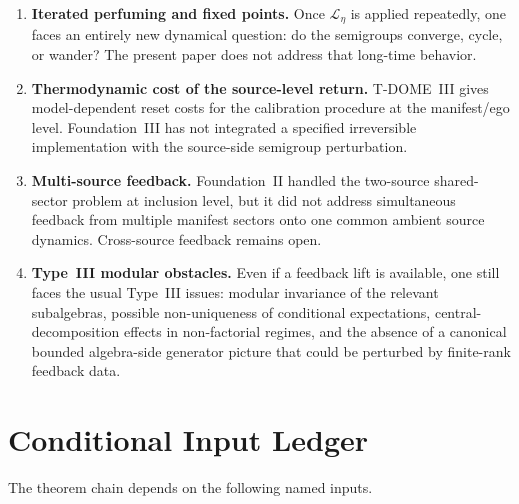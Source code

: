 \documentclass[12pt]{article}
\theoremstyle{definition}
\theoremstyle{remark}
\begin{document}
\begin{enumerate}
  theorem, or a rate-distortion model with a genuine bottleneck, is
  required before any actual minimax deficit can be transported.
\item \textbf{Iterated perfuming and fixed points.} Once
  \(\mathscr L_\eta\) is applied repeatedly, one faces an entirely new
  dynamical question: do the semigroups converge, cycle, or wander? The
  present paper does not address that long-time behavior.
\item \textbf{Thermodynamic cost of the source-level return.} T-DOME~III
  gives model-dependent reset costs for the calibration procedure at the
  manifest/ego level. Foundation~III has not integrated a specified
  irreversible implementation with the source-side semigroup
  perturbation.
\item \textbf{Multi-source feedback.} Foundation~II handled the
  two-source shared-sector problem at inclusion level, but it did not
  address simultaneous feedback from multiple manifest sectors onto one
  common ambient source dynamics. Cross-source feedback remains open.
\item \textbf{Type~III modular obstacles.} Even if a feedback lift is
  available, one still faces the usual Type~III issues: modular
  invariance of the relevant subalgebras, possible non-uniqueness of
  conditional expectations, central-decomposition effects in
  non-factorial regimes, and the absence of a canonical bounded
  algebra-side generator picture that could be perturbed by finite-rank
  feedback data.
\end{enumerate}

\section{Conditional Input Ledger}\label{sec:ledger}

The theorem chain depends on the following named inputs.
\end{document}
